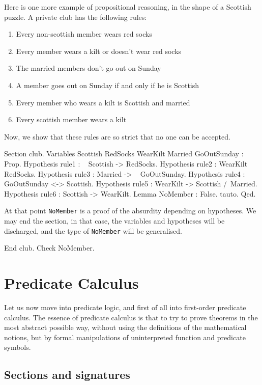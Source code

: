 \documentclass[11pt,a4paper]{book}
\begin{document}
Here is one more example of propositional reasoning, in the shape of
a Scottish puzzle. A private club has the following rules:
\begin{enumerate}
\item Every non-scottish member wears red socks
\item Every member wears a kilt or doesn't wear red socks
\item The married members don't go out on Sunday
\item A member goes out on Sunday if and only if he is Scottish
\item Every member who wears a kilt is Scottish and married
\item Every scottish member wears a kilt
\end{enumerate}
Now, we show that these rules are so strict that no one can be accepted.
\begin{coq_example}
Section club.
Variables Scottish RedSocks WearKilt Married GoOutSunday : Prop.
Hypothesis rule1 : ~ Scottish -> RedSocks.
Hypothesis rule2 : WearKilt \/ ~ RedSocks.
Hypothesis rule3 : Married -> ~ GoOutSunday.
Hypothesis rule4 : GoOutSunday <-> Scottish.
Hypothesis rule5 : WearKilt -> Scottish /\ Married.
Hypothesis rule6 : Scottish -> WearKilt.
Lemma NoMember : False.
tauto.
Qed.
\end{coq_example}
At that point \verb:NoMember: is a proof of the absurdity depending on
hypotheses.
We may end the section, in that case, the variables and hypotheses
will be discharged, and the type of \verb:NoMember: will be
generalised.

\begin{coq_example}
End club.
Check NoMember.
\end{coq_example}

\section{Predicate Calculus}

Let us now move into predicate logic, and first of all into first-order
predicate calculus. The essence of predicate calculus is that to try to prove 
theorems in the most abstract possible way, without using the definitions of 
the mathematical notions, but by formal manipulations of uninterpreted 
function and predicate symbols. 

\subsection{Sections and signatures}
\end{document}
